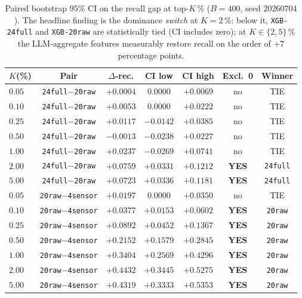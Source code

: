 \begin{table}[t]
\centering
\small
\caption{Paired bootstrap $95\%$ CI on the recall gap at top-$K$\,\%
($B{=}400$, seed $20260704$). The headline finding is the dominance
\emph{switch} at $K{=}2$\,\%: below it, \texttt{XGB-24full} and
\texttt{XGB-20raw} are statistically tied (CI includes zero); at
$K{\in}\{2,5\}\,\%$ the LLM-aggregate features measurably restore recall
on the order of $+7$ percentage points.}
\label{tab:p8-alert-volume-boot}
\begin{tabular}{lcccccc}
\toprule
$K$(\%) & Pair & $\Delta$-rec. & CI low & CI high & Excl.\ 0 & Winner \\
\midrule
$0.05$ & \texttt{24full}${-}$\texttt{20raw}  & $+0.0004$ & $0.0000$ & $+0.0069$ & no  & TIE \\
$0.10$ & \texttt{24full}${-}$\texttt{20raw}  & $+0.0053$ & $0.0000$ & $+0.0222$ & no  & TIE \\
$0.25$ & \texttt{24full}${-}$\texttt{20raw}  & $+0.0117$ & $-0.0142$ & $+0.0385$ & no & TIE \\
$0.50$ & \texttt{24full}${-}$\texttt{20raw}  & $-0.0013$ & $-0.0238$ & $+0.0227$ & no & TIE \\
$1.00$ & \texttt{24full}${-}$\texttt{20raw}  & $+0.0237$ & $-0.0269$ & $+0.0741$ & no & TIE \\
$2.00$ & \texttt{24full}${-}$\texttt{20raw}  & $+0.0759$ & $+0.0331$ & $+0.1212$ & \textbf{YES} & \texttt{24full} \\
$5.00$ & \texttt{24full}${-}$\texttt{20raw}  & $+0.0723$ & $+0.0336$ & $+0.1181$ & \textbf{YES} & \texttt{24full} \\
\midrule
$0.05$ & \texttt{20raw}${-}$\texttt{4sensor}  & $+0.0197$ & $0.0000$ & $+0.0350$ & no  & TIE \\
$0.10$ & \texttt{20raw}${-}$\texttt{4sensor}  & $+0.0377$ & $+0.0153$ & $+0.0602$ & \textbf{YES} & \texttt{20raw} \\
$0.25$ & \texttt{20raw}${-}$\texttt{4sensor}  & $+0.0892$ & $+0.0452$ & $+0.1367$ & \textbf{YES} & \texttt{20raw} \\
$0.50$ & \texttt{20raw}${-}$\texttt{4sensor}  & $+0.2152$ & $+0.1579$ & $+0.2845$ & \textbf{YES} & \texttt{20raw} \\
$1.00$ & \texttt{20raw}${-}$\texttt{4sensor}  & $+0.3404$ & $+0.2569$ & $+0.4296$ & \textbf{YES} & \texttt{20raw} \\
$2.00$ & \texttt{20raw}${-}$\texttt{4sensor}  & $+0.4432$ & $+0.3445$ & $+0.5275$ & \textbf{YES} & \texttt{20raw} \\
$5.00$ & \texttt{20raw}${-}$\texttt{4sensor}  & $+0.4319$ & $+0.3333$ & $+0.5353$ & \textbf{YES} & \texttt{20raw} \\
\bottomrule
\end{tabular}
\end{table}

